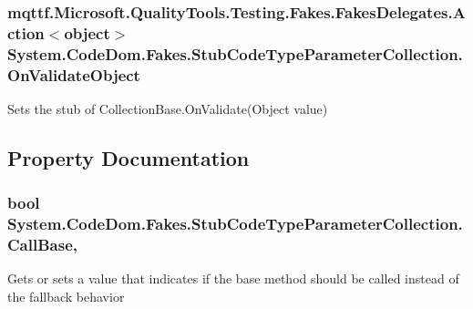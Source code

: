 \hypertarget{class_system_1_1_code_dom_1_1_fakes_1_1_stub_code_type_parameter_collection_a3eeb8f59abb9d03f152a57d45a21d5bc}{
\subsubsection[{On\-Validate\-Object}]{\setlength{\rightskip}{0pt plus 5cm}mqttf.\-Microsoft.\-Quality\-Tools.\-Testing.\-Fakes.\-Fakes\-Delegates.\-Action$<$object$>$ System.\-Code\-Dom.\-Fakes.\-Stub\-Code\-Type\-Parameter\-Collection.\-On\-Validate\-Object}}\label{class_system_1_1_code_dom_1_1_fakes_1_1_stub_code_type_parameter_collection_a3eeb8f59abb9d03f152a57d45a21d5bc}


Sets the stub of Collection\-Base.\-On\-Validate(\-Object value)



\subsection{Property Documentation}
\hypertarget{class_system_1_1_code_dom_1_1_fakes_1_1_stub_code_type_parameter_collection_ae3f7d297ffd0232e828a81bb3b45f9a3}{
\subsubsection[{Call\-Base}]{\setlength{\rightskip}{0pt plus 5cm}bool System.\-Code\-Dom.\-Fakes.\-Stub\-Code\-Type\-Parameter\-Collection.\-Call\-Base\hspace{0.3cm}{\ttfamily [get]}, {\ttfamily [set]}}}\label{class_system_1_1_code_dom_1_1_fakes_1_1_stub_code_type_parameter_collection_ae3f7d297ffd0232e828a81bb3b45f9a3}


Gets or sets a value that indicates if the base method should be called instead of the fallback behavior

